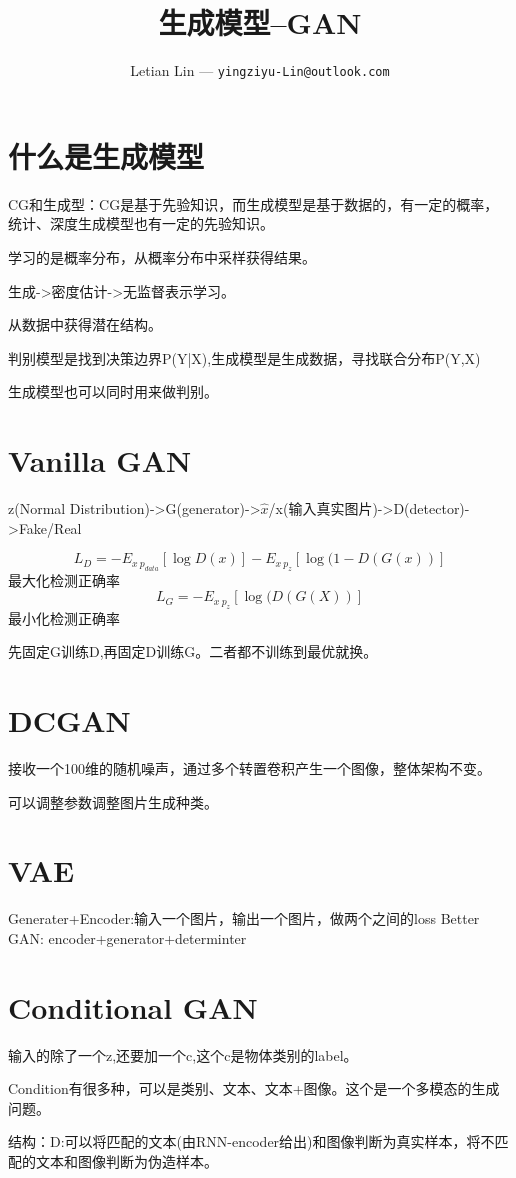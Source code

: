 \documentclass[UTF8]{ctexart}
\title{
	生成模型--GAN
}
\author{
	Letian Lin --- \texttt{yingziyu-Lin@outlook.com}
}
\begin{document}
\maketitle
\section{什么是生成模型}
CG和生成型：CG是基于先验知识，而生成模型是基于数据的，有一定的概率，统计、深度生成模型也有一定的先验知识。

学习的是概率分布，从概率分布中采样获得结果。

生成->密度估计->无监督表示学习。

从数据中获得潜在结构。

判别模型是找到决策边界P(Y|X),生成模型是生成数据，寻找联合分布P(Y,X)

生成模型也可以同时用来做判别。

\section{Vanilla GAN}
z(Normal Distribution)->G(generator)->$\hat{x}$/x(输入真实图片)->D(detector)->Fake/Real

$$L_D=-E_{x~p_{data}}[\log D(x)] - E_{x~p_z}[\log(1-D(G(x))]$$最大化检测正确率
$$L_G=-E_{x~p_z}[\log(D(G(X))]$$最小化检测正确率

先固定G训练D,再固定D训练G。二者都不训练到最优就换。

\section{DCGAN}
接收一个100维的随机噪声，通过多个转置卷积产生一个图像，整体架构不变。

可以调整参数调整图片生成种类。

\section{VAE}
Generater+Encoder:输入一个图片，输出一个图片，做两个之间的loss
Better GAN: encoder+generator+determinter

\section{Conditional GAN}
输入的除了一个z,还要加一个c,这个c是物体类别的label。

Condition有很多种，可以是类别、文本、文本+图像。这个是一个多模态的生成问题。

结构：D:可以将匹配的文本(由RNN-encoder给出)和图像判断为真实样本，将不匹配的文本和图像判断为伪造样本。
\end{document}
